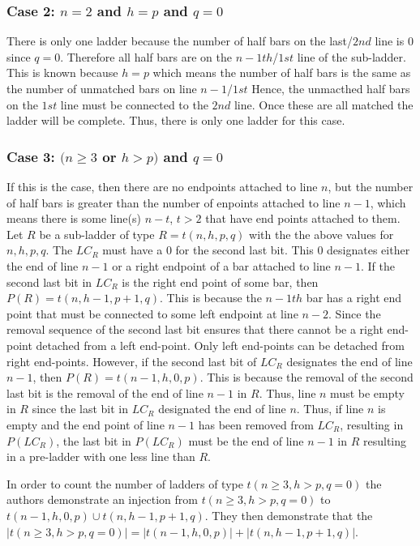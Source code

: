 \subsubsection{Case 2: $n=2$ and $h=p$ and $q=0$}
There is only one ladder because the number of half bars 
on the last/$2nd$ line is 0 since $q=0$. Therefore all half bars are on the 
$n-1th$/$1st$ line of the sub-ladder. This is known because 
$h=p$ which means the number of half bars is the same as 
the number of unmatched bars on line $n-1$/$1st$ Hence, the unmacthed 
half bars on the $1st$ line must be connected to the $2nd$ 
line. Once these are all matched the ladder will be complete. 
Thus, there is only one ladder for this case.

\subsubsection{Case 3: $(n \geq 3$ or $h>p)$ and $q=0$}
If this is the case, then there are no endpoints attached to 
line $n$, but the number of half bars is greater than the 
number of enpoints attached to line $n-1$, which means there is 
some line(s) $n-t$, $t>2$ that have end points attached to them.
Let $R$ be a sub-ladder of type $R=t(n,h,p,q)$ 
with the the above values for $n,h,p,q$. The $LC_{R}$ must have 
a $0$ for the second last bit. This $0$ designates either the 
end of line $n-1$ or a right endpoint of a bar attached to line $n-1$. 
If the second last bit in $LC_{R}$ is the right end point of some 
bar, then $P(R)=t(n,h-1,p+1,q)$. This is because the $n-1th$ bar 
has a right end point that must be connected to some left  
endpoint at line $n-2$. Since the removal sequence of the second 
last bit ensures that there cannot be a right end-point detached 
from a left end-point. Only left end-points can be detached 
from right end-points. However, if the second last bit 
of $LC_{R}$ designates the end of line $n-1$, then $P(R)=t(n-1,h,0,p)$. 
This is because the removal of the second last bit 
is the removal of the end of line $n-1$ in $R$. Thus, 
line $n$ must be empty in $R$ since the last bit in $LC_{R}$
designated the end of line $n$. Thus, if line $n$ is empty 
and the end point of line $n-1$ has been removed from $LC_{R}$, 
resulting in $P(LC_{R})$, the last bit in $P(LC_{R})$ must be 
the end of line $n-1$ in $R$ resulting in a pre-ladder with one 
less line than $R$.\par  
In order to count the number of ladders of type 
$t(n\geq3, h>p, q=0)$ the authors demonstrate an injection 
from $t(n\geq3, h>p, q=0)$ to $t(n-1,h,0,p) \cup t(n,h-1,p+1,q)$.
They then demonstrate that the $|t(n\geq3, h>p, q=0)|=|t(n-1,h,0,p)| + |t(n,h-1,p+1,q)|$.
